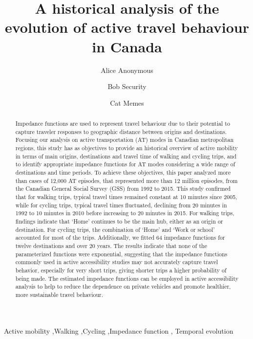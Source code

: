 \documentclass[preprint, 3p,
authoryear]{elsarticle} %
\begin{document}
\begin{frontmatter}

  \title{A historical analysis of the evolution of active travel
behaviour in Canada}
    \author[Some Institute of Technology]{Alice Anonymous%
  }
    \author[Some Institute of Technology]{Bob Security%
  }
    \author[Some Institute of Technology]{Cat Memes%
  }
  
  \begin{abstract}
  Impedance functions are used to represent travel behaviour due to
  their potential to capture traveler responses to geographic distance
  between origins and destinations. Focusing our analysis on active
  transportation (AT) modes in Canadian metropolitan regions, this study
  has as objectives to provide an historical overview of active mobility
  in terms of main origins, destinations and travel time of walking and
  cycling trips, and to identify appropriate impedance functions for AT
  modes considering a wide range of destinations and time periods. To
  achieve these objectives, this paper analyzed more than cases of
  12,000 AT episodes, that represented more than 12 million episodes,
  from the Canadian General Social Survey (GSS) from 1992 to 2015. This
  study confirmed that for walking trips, typical travel times remained
  constant at 10 minutes since 2005, while for cycling trips, typical
  travel times fluctuated, declining from 20 minutes in 1992 to 10
  minutes in 2010 before increasing to 20 minutes in 2015. For walking
  trips, findings indicate that `Home' continues to be the main hub,
  either as an origin or destination. For cycling trips, the combination
  of `Home' and `Work or school' accounted for most of the trips.
  Additionally, we fitted 64 impedance functions for twelve destinations
  and over 20 years. The results indicate that none of the parameterized
  functions were exponential, suggesting that the impedance functions
  commonly used in active accessibility studies may not accurately
  capture travel behavior, especially for very short trips, giving
  shorter trips a higher probability of being made. The estimated
  impedance functions can be employed in active accessibility analysis
  to help to reduce the dependence on private vehicles and promote
  healthier, more sustainable travel behaviour.
  \end{abstract}
    \begin{keyword}
    Active mobility \sep Walking \sep Cycling \sep Impedance
function \sep 
    Temporal evolution
  \end{keyword}
  
 \end{frontmatter}
\end{document}
